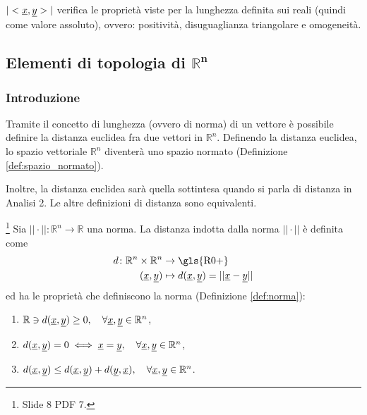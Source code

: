 $|<\uline x,\uline y>|$ verifica le proprietà viste per la lunghezza definita sui reali (quindi come valore assoluto), ovvero: positività, disuguaglianza triangolare e omogeneità.

\subsection{Elementi di topologia di \texorpdfstring{${\boldsymbol{\mathbb R^n}}$}{Rn}}
\subsubsection{Introduzione}
Tramite il concetto di lunghezza (ovvero di norma) di un vettore è possibile definire la distanza euclidea fra due vettori in $\mathbb R^n$. Definendo la distanza euclidea, lo spazio vettoriale $\mathbb R^n$ diventerà uno \gls{spazio normato} (Definizione \ref{def:spazio_normato}).

Inoltre, la distanza euclidea sarà quella sottintesa quando si parla di distanza in Analisi 2. Le altre definizioni di distanza sono equivalenti. 

\begin{definition}\footnote{Slide 8 PDF 7.}
    Sia $||\cdot||\colon\mathbb R^n\rightarrow\mathbb R$ una norma. La distanza indotta dalla norma $||\cdot||$ è definita come
    \begin{equation*}
        \begin{aligned}
            d\colon\mathbb R^n\times\mathbb R^n&\rightarrow\text{\gls{R0+}}\\
            (\uline x,\uline y)&\mapsto d(\uline x,\uline y)=||\uline x - \uline y||
        \end{aligned}
    \end{equation*}
    ed ha le proprietà che definiscono la norma (Definizione \ref{def:norma}):
    \begin{enumerate}
        \item $\mathbb R\ni d(\uline x, \uline y)\geq 0,\quad\forall\uline x,\uline y\in\mathbb R^n$,
        \item $d(\uline x,\uline y)=0\iff \uline x=\uline y,\quad\forall\uline x,\uline y\in\mathbb R^n$,
        \item $d(\uline x,\uline y)\leq d(\uline x,\uline y) +d(\uline y,\uline x),\quad\forall\uline x,\uline y\in\mathbb R^n$.
    \end{enumerate}
\end{definition}

